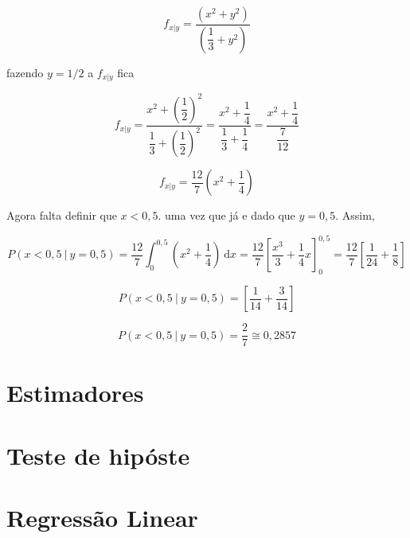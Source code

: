 \documentclass[
]{book}
\begin{document}
\[
  f_{x|y} = \dfrac{(x^2 + y^2)}{\left( \dfrac{1}{3} + y^2 \right)}
\]

fazendo \(y=1/2\) a \(f_{x|y}\) fica

\[
  f_{x|y} = \dfrac{x^2 + \left( \dfrac{1}{2}\right)^2}{ \dfrac{1}{3} + \left( \dfrac{1}{2} \right)^2} =  \dfrac{x^2 + \dfrac{1}{4}}{ \dfrac{1}{3} + \dfrac{1}{4}} = \dfrac{x^2 + \dfrac{1}{4}}{ \dfrac{7}{12}}
\]

\[
  f_{x|y} = \dfrac{12}{7}\left(x^2 + \dfrac{1}{4}\right)
\]

Agora falta definir que \(x<0,5\). uma vez que já e dado que \(y=0,5\). Assim,

\[
P(x<0,5~|~y=0,5) = \dfrac{12}{7} \int_{0}^{0,5}\left(x^2 + \dfrac{1}{4}\right)~\text{d}x = \dfrac{12}{7} \left[\dfrac{x^3}{3} + \dfrac{1}{4}x  \right]_{0}^{0,5} =  \dfrac{12}{7} \left[\dfrac{1}{24} + \dfrac{1}{8} \right] 
\]

\[
P(x<0,5~|~y=0,5) = \left[\dfrac{1}{14} + \dfrac{3}{14} \right] 
\]

\[
P(x<0,5~|~y=0,5) = \dfrac{2}{7} \cong 0,2857 
\]

\hypertarget{estimadores}{%
\chapter{Estimadores}\label{estimadores}}

\hypertarget{teste-de-hipuxf3ste}{%
\chapter{Teste de hipóste}\label{teste-de-hipuxf3ste}}

\hypertarget{regressuxe3o-linear}{%
\chapter{Regressão Linear}\label{regressuxe3o-linear}}

  
\end{document}
